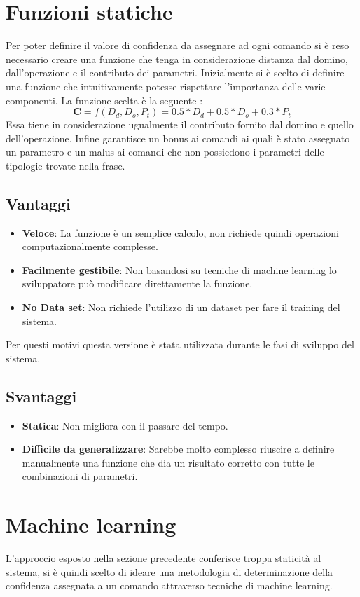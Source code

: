 \documentclass[twoside]{supsistudent}
\begin{document}
\section{Funzioni statiche}
Per poter definire il valore di confidenza da assegnare ad ogni comando si è reso necessario creare una funzione che tenga in considerazione distanza dal domino, dall'operazione e il contributo dei parametri.
Inizialmente si è scelto di definire una funzione che intuitivamente potesse rispettare l'importanza delle varie componenti.
La funzione scelta è la seguente :
\[
\boldsymbol{C} = f(D_{d} ,D_{o},P_{t}) = 0.5*D_{d}+0.5*D_{o}+0.3*P_{t}
\]
Essa tiene in considerazione ugualmente il contributo fornito dal domino e quello dell'operazione. Infine garantisce un bonus ai comandi ai quali è stato assegnato un parametro e un malus ai comandi che non possiedono i parametri delle tipologie trovate nella frase.
\subsection{Vantaggi}
\begin{itemize}
  \item \textbf{Veloce}: La funzione è un semplice calcolo, non richiede quindi operazioni computazionalmente complesse.
   \item \textbf{Facilmente gestibile}: Non basandosi su tecniche di machine learning lo sviluppatore può modificare direttamente la funzione.
  \item \textbf{No Data set}: Non richiede l'utilizzo di un dataset per fare il training del sistema.
\end{itemize}
Per questi motivi questa versione è stata utilizzata durante le fasi di sviluppo del sistema.
\subsection{Svantaggi}
\begin{itemize}
  \item \textbf{Statica}: Non migliora con il passare del tempo.
   \item \textbf{Difficile da generalizzare}: Sarebbe molto complesso riuscire a definire manualmente una funzione che dia un risultato corretto con tutte le combinazioni di parametri.
\end{itemize}

\section{Machine learning}
L'approccio esposto nella sezione precedente conferisce troppa staticità al sistema, si è quindi scelto di ideare una metodologia di determinazione della confidenza assegnata a un comando attraverso tecniche di machine learning.
\end{document}
